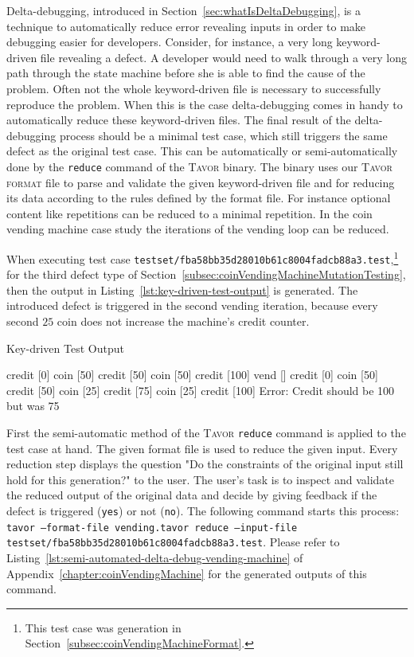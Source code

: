 Delta-debugging, introduced in Section~\ref{sec:whatIsDeltaDebugging}, is a technique to automatically reduce error revealing inputs in order to make debugging easier for developers. Consider, for instance, a very long keyword-driven file revealing a defect. A developer would need to walk through a very long path through the state machine before she is able to find the cause of the problem. Often not the whole keyword-driven file is necessary to successfully reproduce the problem. When this is the case delta-debugging comes in handy to automatically reduce these keyword-driven files. The final result of the delta-debugging process should be a minimal test case, which still triggers the same defect as the original test case. This can be automatically or semi-automatically done by the \texttt{reduce} command of the \textsc{Tavor} binary. The binary uses our \textsc{Tavor format} file to parse and validate the given keyword-driven file and for reducing its data according to the rules defined by the format file. For instance optional content like repetitions can be reduced to a minimal repetition. In the coin vending machine case study the iterations of the vending loop can be reduced.

When executing test case \texttt{testset/fba58bb35d28010b61c8004fadcb88a3.test},\footnote{This test case was generation in Section~\ref{subsec:coinVendingMachineFormat}.} for the third defect type of Section~\ref{subsec:coinVendingMachineMutationTesting}, then the output in Listing~\ref{lst:key-driven-test-output} is generated. The introduced defect is triggered in the second vending iteration, because every second $25$ coin does not increase the machine's credit counter.

\begin{listing}
\caption{Key-driven Test Output}
\label{lst:key-driven-test-output}
\begin{textcode}
credit [0]
coin [50]
credit [50]
coin [50]
credit [100]
vend []
credit [0]
coin [50]
credit [50]
coin [25]
credit [75]
coin [25]
credit [100]
Error: Credit should be 100 but was 75
\end{textcode}
\end{listing}

First the semi-automatic method of the \textsc{Tavor} \texttt{reduce} command is applied to the test case at hand. The given format file is used to reduce the given input. Every reduction step displays the question "Do the constraints of the original input still hold for this generation?" to the user. The user's task is to inspect and validate the reduced output of the original data and decide by giving feedback if the defect is triggered (\texttt{yes}) or not (\texttt{no}). The following command starts this process: \texttt{tavor --format-file vending.tavor reduce --input-file testset/fba58bb35d28010b61c8004fadcb88a3.test}. Please refer to Listing~\ref{lst:semi-automated-delta-debug-vending-machine} of Appendix~\ref{chapter:coinVendingMachine} for the generated outputs of this command.

